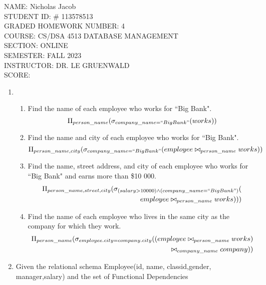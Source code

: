 \documentclass[11pt]{article}
\author{}
\title{}
\begin{document}
{\Large
\noindent NAME:  Nicholas Jacob\\ 
STUDENT ID: \# 113578513\\
GRADED HOMEWORK NUMBER: 4\\
COURSE: CS/DSA 4513 DATABASE MANAGEMENT\\ 
SECTION: ONLINE\\SEMESTER: FALL 2023\\
INSTRUCTOR:  DR. LE GRUENWALD\\
 SCORE:}

\newpage
\begin{enumerate} 
\item 
\begin{enumerate}
\item Find the name of each employee who works for ``Big Bank".
\[
\Pi_{person\_name}(\sigma_{company\_name = ``Big Bank"}(works))
\]
\item Find the name and city of each employee who works for ``Big Bank".
\[
\Pi_{person\_name, city}(\sigma_{company\_name = ``Big Bank"}(employee \bowtie_{%
person\_name} works))
\]
\item Find the name, street address, and city of each employee who works for ``Big Bank" and earns more than \$10 000.
\begin{eqnarray*}
\Pi_{person\_name,street, city}(
\sigma_{(salary > 10 000) \land (company\_name = ``Big Bank")}(\\employee \bowtie_{%
person\_name} works)))
\end{eqnarray*}
\item Find the name of each employee who lives in the same city as the company for which they work.
\begin{eqnarray*}
\Pi_{person\_name}
(
\sigma_{employee.city = company.city}
((
employee \bowtie_{%
person\_name} works)\\
\bowtie_{company\_name} company)
)
\end{eqnarray*}

\end{enumerate}
\item Given the relational schema Employee(id, name, classid,gender, manager,salary) and the set of Functional Dependencies 


\end{enumerate}
\end{document}
